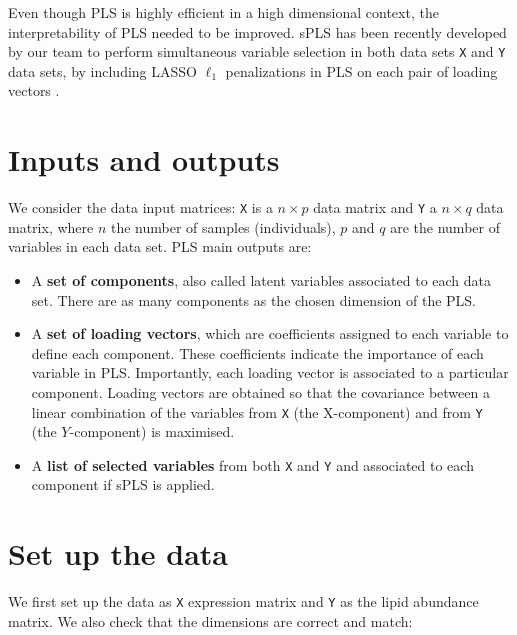 \documentclass[]{book}
\newenvironment{Shaded}{\begin{snugshade}}{\end{snugshade}}
\newcommand{\KeywordTok}[1]{\textcolor[rgb]{0.13,0.29,0.53}{\textbf{#1}}}
\newcommand{\NormalTok}[1]{#1}
\newcommand{\OperatorTok}[1]{\textcolor[rgb]{0.81,0.36,0.00}{\textbf{#1}}}
\newcommand{\StringTok}[1]{\textcolor[rgb]{0.31,0.60,0.02}{#1}}
\begin{document}
Even though PLS is highly efficient in a high dimensional context, the interpretability of PLS needed to be improved. sPLS has been recently developed by our team to perform simultaneous variable selection in both data sets \texttt{X} and \texttt{Y} data sets, by including LASSO \(\ell_1\) penalizations in PLS on each pair of loading vectors \citep{Lec08}.

\hypertarget{inputs-and-outputs-1}{%
\section{Inputs and outputs}\label{inputs-and-outputs-1}}

We consider the data input matrices: \texttt{X} is a \(n \times p\) data matrix and \texttt{Y} a \(n \times q\) data matrix, where \(n\) the number of samples (individuals), \(p\) and \(q\) are the number of variables in each data set. PLS main outputs are:

\begin{itemize}
\item
  A \textbf{set of components}, also called latent variables associated to each data set. There are as many components as the chosen dimension of the PLS.
\item
  A \textbf{set of loading vectors}, which are coefficients assigned to each variable to define each component. These coefficients indicate the importance of each variable in PLS. Importantly, each loading vector is associated to a particular component. Loading vectors are obtained so that the covariance between a linear combination of the variables from \texttt{X} (the X-component) and from \texttt{Y} (the \(Y\)-component) is maximised.
\item
  A \textbf{list of selected variables} from both \texttt{X} and \texttt{Y} and associated to each component if sPLS is applied.
\end{itemize}

\hypertarget{set-up-the-data-1}{%
\section{Set up the data}\label{set-up-the-data-1}}

We first set up the data as \texttt{X} expression matrix and \texttt{Y} as the lipid abundance matrix. We also check that the dimensions are correct and match:

\begin{Shaded}
\end{Shaded}
\end{document}
